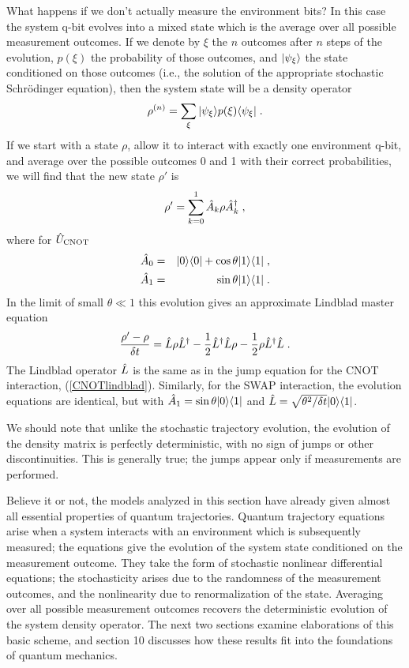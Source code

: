 What happens if we don't actually measure the environment bits?  In this
case the system q-bit evolves into a mixed state which is the average over
all possible measurement outcomes.  If we denote by $\xi$ the $n$ outcomes
after $n$ steps of the evolution, $p(\xi)$ the probability of those outcomes,
and ${| \psi_\xi \rangle}$ the state conditioned on those outcomes (i.e., the
solution of the appropriate stochastic Schr\"odinger equation), then the
system state will be a density operator
\begin{equation}
\rho^{(n)} = \sum_\xi {| \psi_\xi \rangle} p(\xi) {\langle \psi_\xi |} \;.
\end{equation}
If we start with a state $\rho$, allow it to interact with exactly
one environment q-bit, and average over the possible outcomes
0 and 1 with their correct probabilities, we will find that the new state
$\rho'$ is
\begin{equation}
\rho' = \sum_{k=0}^1 {\hat A}_k \rho {\hat A^\dagger}_k \;,
\label{rhoprime}
\end{equation}
where for ${\hat U}_{\rm CNOT}$
\begin{eqnarray}
{\hat A}_0 &=& {| 0 \rangle}{\langle 0 |} + \cos\theta {| 1 \rangle}{\langle 1 |} \;, \nonumber\\
{\hat A}_1 &=& \sin\theta {| 1 \rangle}{\langle 1 |} \;.
\label{ucnot1}
\end{eqnarray}
In the limit of small $\theta\ll1$ this evolution gives an approximate
Lindblad master equation
\begin{equation}
{{\rho' - \rho}\over\delta t} =
  {\hat L} \rho {\hat L^\dagger} - {1\over2} {\hat L^\dagger}{\hat L} \rho
  - {1\over2} \rho {\hat L^\dagger}{\hat L} \;.
\label{mean_lindblad}
\end{equation}
The Lindblad operator ${\hat L}$ is the same as in the jump equation for
the CNOT interaction, (\ref{CNOTlindblad}).  Similarly, for
the SWAP interaction, the evolution equations are
identical, but with ${\hat A}_1 = \sin\theta {| 0 \rangle}{\langle 1 |}$ and
${\hat L} = \sqrt{\theta^2/\delta t}{| 0 \rangle}{\langle 1 |}$.

We should note that unlike the stochastic trajectory evolution, the
evolution of the density matrix is perfectly deterministic, with no sign
of jumps or other discontinuities.  This is generally true; the jumps
appear only if measurements are performed.

Believe it or not, the models analyzed in this section have
already given almost all essential properties of quantum trajectories.
Quantum trajectory equations arise when a system interacts with an
environment which is subsequently measured; the equations give the
evolution of the system state conditioned on the measurement outcome.
They take the form of stochastic nonlinear differential equations; the
stochasticity arises due to the randomness of the measurement outcomes,
and the nonlinearity due to renormalization of the state.  Averaging
over all possible measurement outcomes recovers the deterministic
evolution of the system density operator.  The next two sections examine
elaborations of this basic scheme, and section 10 discusses how
these results fit into the foundations of quantum mechanics.


